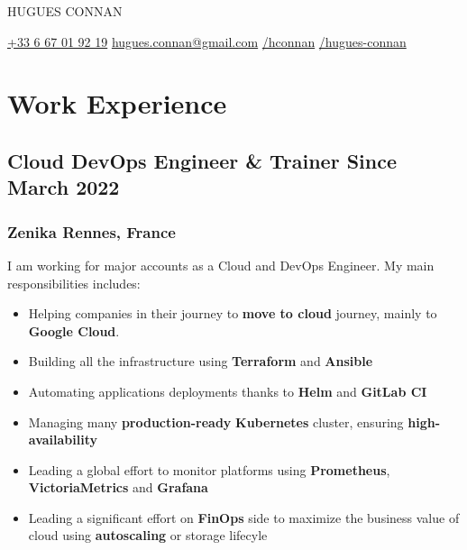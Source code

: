 \documentclass[11pt]{article}
\newcommand{\rside}[1]{
  \hfill {\normalfont\color{gray} #1}%
}
\begin{document}

\begin{center}
  {
    \fontsize{36}{12} 
    \selectfont
    \color{accent} 
    HUGUES CONNAN %
  } \\ \medskip


  \href{tel:+33667019219}{{\color{accent}{\faPhone}} +33 6 67 01 92 19} \quad
  \href{mailto:hugues.connan@gmail.com}{{\color{accent}{\faEnvelope}} hugues.connan@gmail.com} \quad 
  \href{https://github.com/hconnan}{{\color{accent}{\faGithub}} /hconnan} \quad
  \href{https://www.linkedin.com/in/hugues-connan}{{\color{accent}{\faLinkedin}} /hugues-connan} \quad
\end{center}


\section{Work Experience}

\subsection{Cloud DevOps Engineer \& Trainer \rside{Since March 2022}}
\subsubsection{Zenika \rside{Rennes, France}}

\begin{justify}
  I am working for major accounts as a Cloud and DevOps Engineer. My main responsibilities includes:
\end{justify}
\vspace{-2mm}

\begin{itemize}
  \item Helping companies in their journey to \textbf{move to cloud} journey, mainly to \textbf{Google Cloud}.
  \item Building all the infrastructure using \textbf{Terraform} and \textbf{Ansible}
  \item Automating applications deployments thanks to \textbf{Helm} and \textbf{GitLab CI}
  \item Managing many \textbf{production-ready} \textbf{Kubernetes} cluster, ensuring \textbf{high-availability}
  \item Leading a global effort to monitor platforms using \textbf{Prometheus}, \textbf{VictoriaMetrics} and \textbf{Grafana}
  \item Leading a significant effort on \textbf{FinOps} side to maximize the business value of cloud using \textbf{autoscaling} or storage lifecyle 
\end{itemize}
\end{document}

